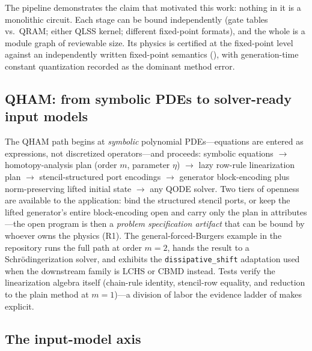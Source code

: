 The pipeline demonstrates the claim that motivated this work: nothing in it
is a monolithic circuit.  Each stage can be bound independently (gate
tables vs.\ QRAM; either QLSS kernel; different fixed-point formats), and
the whole is a module graph of reviewable size.  Its physics is certified
at the fixed-point level against an independently written fixed-point
semantics (), with generation-time constant
quantization recorded as the dominant method error.

\subsection{QHAM: from symbolic PDEs to solver-ready input models}
\label{sec:qham-case}

The QHAM path begins at \emph{symbolic} polynomial PDEs---equations are
entered as expressions, not discretized operators---and proceeds: symbolic
equations $\rightarrow$ homotopy-analysis plan (order $m$, parameter
$\eta$) $\rightarrow$ lazy row-rule linearization plan $\rightarrow$
stencil-structured port encodings $\rightarrow$ generator block-encoding
plus norm-preserving lifted initial state $\rightarrow$ any QODE solver.
Two tiers of openness are available to the application: bind the structured
stencil ports, or keep the lifted generator's entire block-encoding open and
carry only the plan in attributes---the open program is then a
\emph{problem specification artifact} that can be bound by whoever owns the
physics (R1).  The general-forced-Burgers example in the repository runs
the full path at order $m=2$, hands the result to a Schr\"odingerization
solver, and exhibits the \texttt{dissipative\_shift} adaptation used when
the downstream family is LCHS or CBMD instead.  Tests verify the
linearization algebra itself (chain-rule identity, stencil-row equality,
and reduction to the plain method at $m=1$)---a division of labor the
evidence ladder of  makes explicit.

\subsection{The input-model axis}
\label{sec:input-models}

